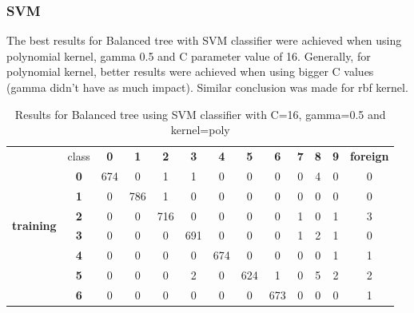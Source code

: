 \subsubsection{SVM}

The best results for Balanced tree with SVM classifier were achieved when using polynomial kernel, gamma 0.5 and C parameter value of 16. Generally, for polynomial kernel, better results were achieved when using bigger C values (gamma didn't have as much impact). Similar conclusion was made for rbf kernel.

\begin{table}[htp]
	\centering
	\caption{Results for Balanced tree using SVM classifier with C=16, gamma=0.5 and kernel=poly}
	\label{balanced_tree_svm_results}
	\begin{tabular}{|c|c|c|c|c|c|c|c|c|c|c|c|c|}
		\hline
		\multirow{11}{*}{\textbf{training}} & class      & \textbf{0} & \textbf{1} & \textbf{2} & \textbf{3} & \textbf{4} & \textbf{5} & \textbf{6} & \textbf{7} & \textbf{8} & \textbf{9} & \textbf{foreign} \\ \cline{2-13} 
		& \textbf{0} & 674        & 0          & 1          & 1          & 0          & 0          & 0          & 0          & 4          & 0          & 0                \\ \cline{2-13} 
		& \textbf{1} & 0          & 786        & 1          & 0          & 0          & 0          & 0          & 0          & 0          & 0          & 0                \\ \cline{2-13} 
		& \textbf{2} & 0          & 0          & 716        & 0          & 0          & 0          & 0          & 1          & 0          & 1          & 3                \\ \cline{2-13} 
		& \textbf{3} & 0          & 0          & 0          & 691        & 0          & 0          & 0          & 1          & 2          & 1          & 0                \\ \cline{2-13} 
		& \textbf{4} & 0          & 0          & 0          & 0          & 674        & 0          & 0          & 0          & 0          & 1          & 1                \\ \cline{2-13} 
		& \textbf{5} & 0          & 0          & 0          & 2          & 0          & 624        & 1          & 0          & 5          & 2          & 2                \\ \cline{2-13} 
		& \textbf{6} & 0          & 0          & 0          & 0          & 0          & 0          & 673        & 0          & 0          & 0          & 1                \\ \cline{2-13} 

\end{tabular}
\end{table}
